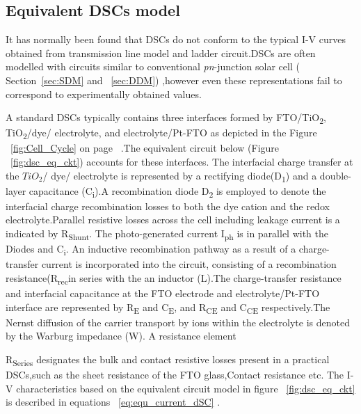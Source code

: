\subsection{Equivalent DSCs model}\label{sec:eDDM}

It has normally been found that \ac{DSCs} do not conform to the typical I-V curves obtained from transmission line model and ladder circuit\cite{yong2008modeling}.\ac{DSCs} are often modelled with circuits similar to conventional \textit{pn}-junction solar cell ( Section~\ref{sec:SDM} and ~\ref{sec:DDM}) ,however even these representations fail to correspond to experimentally obtained values.

A standard \ac{DSCs} typically contains three interfaces formed by FTO/TiO\textsubscript{2}, TiO\textsubscript{2}/dye/ electrolyte, and electrolyte/Pt-FTO as depicted in the Figure ~\ref{fig:Cell_Cycle} on page ~\pageref{fig:Cell_Cycle}.The equivalent circuit below (Figure ~\ref{fig:dsc_eq_ckt}) accounts for these interfaces. The interfacial charge transfer at the $TiO_{2}$/ dye/ electrolyte is represented by a rectifying diode(D\textsubscript{1}) and a double-layer capacitance (C\textsubscript{i}).A recombination diode D\textsubscript{2} is employed to denote the interfacial charge recombination losses to both the dye cation and the redox electrolyte.Parallel resistive losses across the cell including leakage current is a indicated by R\textsubscript{Shunt}. The photo-generated current I\textsubscript{ph} is in parallel with the Diodes and C\textsubscript{i}. An inductive recombination pathway as a result of a charge-transfer current is incorporated into the circuit, consisting of a recombination resistance(R\textsubscript{rec}in series with the an inductor (L).The charge-transfer resistance and interfacial capacitance at the FTO electrode and electrolyte/Pt-FTO interface are represented by R\textsubscript{E} and C\textsubscript{E}, and R\textsubscript{CE} and C\textsubscript{CE} respectively.The Nernst diffusion of the carrier transport by ions within the electrolyte is denoted by the Warburg impedance (W). A resistance element {R\textsubscript{Series} designates the bulk and contact resistive losses present in a practical \ac{DSCs},such as the sheet resistance of the FTO glass,Contact resistance etc. The I-V characteristics based on the equivalent circuit model in figure ~\ref{fig:dsc_eq_ckt} is described in equations ~\ref{eq:equ_current_dSC} \cite{yong2008modeling}.
    


}
